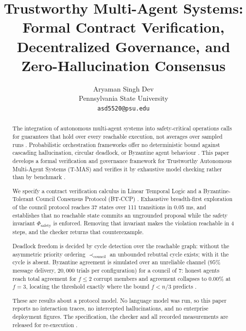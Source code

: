 \documentclass[10pt,journal,compsoc,twocolumn]{IEEEtran}
\begin{document}
\title{Trustworthy Multi-Agent Systems: Formal Contract Verification, Decentralized Governance, and Zero-Hallucination Consensus}

\author{
Aryaman Singh Dev\\
Pennsylvania State University \\
\texttt{asd5520@psu.edu}
}

\maketitle

\begin{abstract}
The integration of autonomous multi-agent systems into safety-critical operations calls for guarantees that hold over every reachable execution, not averages over sampled runs \cite{arxiv_2005_14165,arxiv_2203_02155}. Probabilistic orchestration frameworks offer no deterministic bound against cascading hallucination, circular deadlock, or Byzantine agent behaviour \cite{arxiv_2312_03893,arxiv_2406_00584}. This paper develops a formal verification and governance framework for Trustworthy Autonomous Multi-Agent Systems (T-MAS) and verifies it by exhaustive model checking rather than by benchmark \cite{crossref_10_1109_access_2026_3656309}.

We specify a contract verification calculus in Linear Temporal Logic and a Byzantine-Tolerant Council Consensus Protocol (BT-CCP) \cite{crossref_10_1145_3689096_3689462}. Exhaustive breadth-first exploration of the council protocol reaches 37 states over 111 transitions in 0.05 ms, and establishes that no reachable state commits an ungrounded proposal while the safety invariant $\Phi_{\text{safety}}$ is enforced. Removing that invariant makes the violation reachable in 4 steps, and the checker returns that counterexample.

Deadlock freedom is decided by cycle detection over the reachable graph: without the asymmetric priority ordering $\prec_{\text{council}}$ an unbounded rebuttal cycle exists; with it the cycle is absent. Byzantine agreement is simulated over an unreliable channel ($95\%$ message delivery, $20{,}000$ trials per configuration) for a council of $7$: honest agents reach total agreement for $f \le 2$ corrupt members and agreement collapses to $0.00\%$ at $f = 3$, locating the threshold exactly where the bound $f < n/3$ predicts \cite{arxiv_2404_01131}.

These are results about a protocol model. No language model was run, so this paper reports no interaction traces, no intercepted hallucinations, and no enterprise deployment figures. The specification, the checker and all recorded measurements are released for re-execution \cite{arxiv_2501_02497,crossref_10_1201_9788743808145_14}.
\end{abstract}
\end{document}
